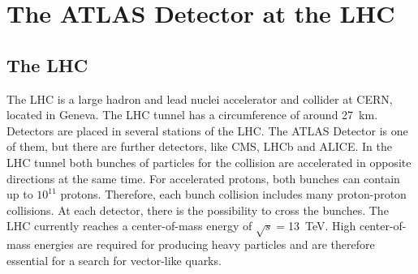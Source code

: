 \chapter{The ATLAS Detector at the LHC}

\section{The LHC}
The LHC \cite{LHC} is a large hadron and lead nuclei accelerator and collider at CERN, located in Geneva.
The LHC tunnel has a circumference of around \SI{27}{km}. 
Detectors are placed in several stations of the LHC.
The ATLAS Detector is one of them, but there are further detectors, like CMS, LHCb and ALICE.
In the LHC tunnel both bunches of particles for the collision are accelerated in opposite directions at the same time.
For accelerated protons, both bunches can contain up to $10^{11}$ protons.
Therefore, each bunch collision includes many proton-proton collisions.
At each detector, there is the possibility to cross the bunches. 
The LHC currently reaches a center-of-mass energy of $\sqrt{s} =$\SI{13}{TeV}. 
High center-of-mass energies are required for producing heavy particles and are therefore essential for a search for vector-like quarks.


